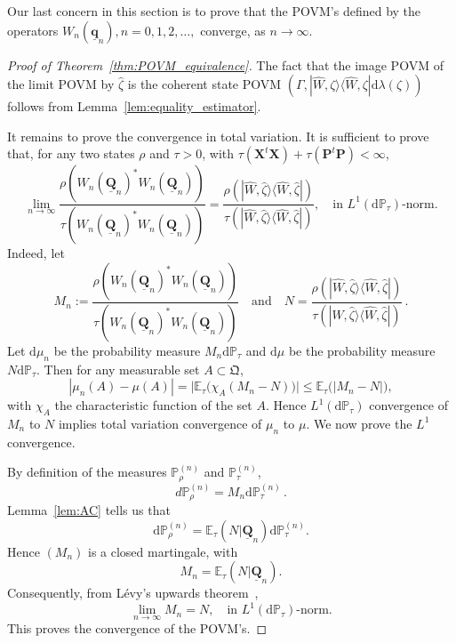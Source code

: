 \documentclass[11pt]{article}
\newcommand{\ket}[1]{|{#1}\rangle}
\newcommand{\bra}[1]{\langle{#1}|}
\renewcommand{\d}{{\mathrm d}}
\begin{document}
Our last concern in this section is to prove that the POVM's defined by the operators $W_n(\underline{\mathbf q}_n), n=0,1,2,\dots,$ converge, as $n\rightarrow \infty$.
\begin{proof}[Proof of Theorem~\ref{thm:POVM_equivalence}]
	The fact that the image POVM of the limit POVM by $\widehat{\zeta}$ is the coherent state POVM $(\Gamma,\ket{\widehat{W},\zeta}\bra{\widehat{W},\zeta}\d\lambda(\zeta))$ follows from Lemma~\ref{lem:equality_estimator}. 
	
	It remains to prove the convergence in total variation. It is sufficient to prove that, for any two states $\rho$ and $\tau>0$, with $\tau(\mathbf{X}^t\mathbf{X})+\tau(\mathbf{P}^t\mathbf{P})<\infty$,
	$$\lim_{n\to\infty}\frac{\rho(W_n(\underline{\mathbf Q}_n)^*W_n(\underline{\mathbf Q}_n))}{\tau(W_n(\underline{\mathbf Q}_n)^*W_n(\underline{\mathbf Q}_n))}=\frac{\rho(\ket{\widehat W,\widehat \zeta}\bra{\widehat W,\widehat \zeta})}{\tau(\ket{\widehat W,\widehat \zeta}\bra{\widehat W,\widehat \zeta})},\quad \mbox{in }L^1(\d\mathbb P_\tau)\mbox{-norm}.$$
	Indeed, let 
	$$M_n:=\frac{\rho(W_n(\underline{\mathbf Q}_n)^*W_n(\underline{\mathbf Q}_n))}{\tau(W_n(\underline{\mathbf Q}_n)^*W_n(\underline{\mathbf Q}_n))}\quad\mbox{and}\quad N=\frac{\rho(\ket{\widehat W,\widehat \zeta}\bra{\widehat W,\widehat \zeta})}{\tau(\ket{\widehat W,\widehat \zeta}\bra{\widehat W,\widehat \zeta})}\,.$$
	Let $\d \mu_n$ be the probability measure $M_n\d\mathbb P_\tau$ and $\d \mu$ be the probability measure $N\d\mathbb P_{\tau}$.
	Then for any measurable set $A\subset\mathfrak Q$,
	$$|\mu_n(A)-\mu(A)|=\big|\mathbb E_\tau\big(\chi_{A}(M_n-N)\big)\big|\leq \mathbb E_\tau\big(\big|M_n-N\big|\big),$$
	with $\chi_A$ the characteristic function of the set $A$.
	Hence $L^1(\d\mathbb P_\tau)$ convergence of $M_n$ to $N$ implies total variation convergence of $\mu_n$ to $\mu$. We now prove the $L^1$ convergence. 
	
	By definition of the measures $\mathbb P_\rho^{(n)}$ and $\mathbb P_\tau^{(n)}$,
	$$d\mathbb P_\rho^{(n)}=M_n\d\mathbb P_\tau^{(n)}\,.$$
	Lemma~\ref{lem:AC} tells us that
	$$\d\mathbb P_\rho^{(n)}=\mathbb E_\tau\left(N|\underline{\mathbf Q}_n\right)\d\mathbb P_\tau^{(n)}.$$
	Hence $(M_n)$ is a closed martingale, with
	$$M_n=\mathbb E_\tau\left(N|\underline{\mathbf Q}_n\right).$$
	Consequently, from L\'evy's upwards theorem~\cite[Theorem 27.3]{JacodProtter},
	$$\lim_{n\to\infty}M_n=N,\quad
	\mbox{in } L^1(\d\mathbb P_\tau)\mbox{-norm}.$$
	This proves the convergence of the POVM's. 
\end{proof}
\end{document}
